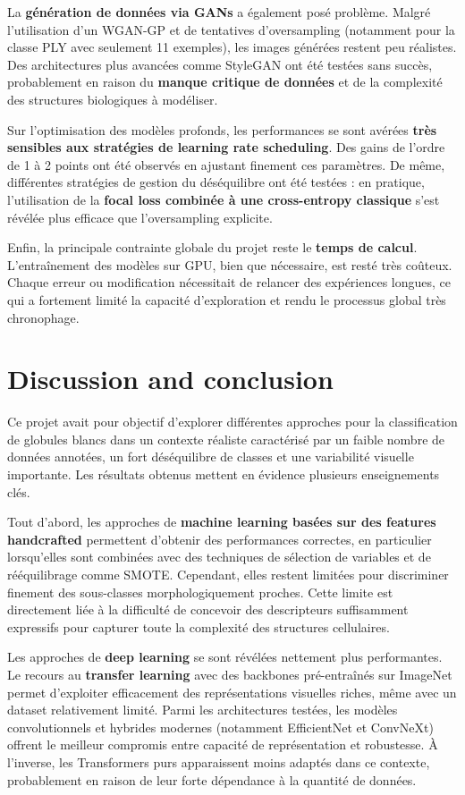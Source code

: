 \documentclass[journal,twocolumn]{IEEEtran}
\begin{document}
La \textbf{génération de données via GANs} a également posé problème. Malgré l’utilisation d’un WGAN-GP et de tentatives d’oversampling (notamment pour la classe PLY avec seulement 11 exemples), les images générées restent peu réalistes. Des architectures plus avancées comme StyleGAN ont été testées sans succès, probablement en raison du \textbf{manque critique de données} et de la complexité des structures biologiques à modéliser.

Sur l’optimisation des modèles profonds, les performances se sont avérées \textbf{très sensibles aux stratégies de learning rate scheduling}. Des gains de l’ordre de 1 à 2 points ont été observés en ajustant finement ces paramètres. De même, différentes stratégies de gestion du déséquilibre ont été testées : en pratique, l’utilisation de la \textbf{focal loss combinée à une cross-entropy classique} s’est révélée plus efficace que l’oversampling explicite.

Enfin, la principale contrainte globale du projet reste le \textbf{temps de calcul}. L’entraînement des modèles sur GPU, bien que nécessaire, est resté très coûteux. Chaque erreur ou modification nécessitait de relancer des expériences longues, ce qui a fortement limité la capacité d’exploration et rendu le processus global très chronophage.


\section{Discussion and conclusion}

Ce projet avait pour objectif d’explorer différentes approches pour la classification de globules blancs dans un contexte réaliste caractérisé par un faible nombre de données annotées, un fort déséquilibre de classes et une variabilité visuelle importante. Les résultats obtenus mettent en évidence plusieurs enseignements clés.

Tout d’abord, les approches de \textbf{machine learning basées sur des features handcrafted} permettent d’obtenir des performances correctes, en particulier lorsqu’elles sont combinées avec des techniques de sélection de variables et de rééquilibrage comme SMOTE. Cependant, elles restent limitées pour discriminer finement des sous-classes morphologiquement proches. Cette limite est directement liée à la difficulté de concevoir des descripteurs suffisamment expressifs pour capturer toute la complexité des structures cellulaires.

Les approches de \textbf{deep learning} se sont révélées nettement plus performantes. Le recours au \textbf{transfer learning} avec des backbones pré-entraînés sur ImageNet permet d’exploiter efficacement des représentations visuelles riches, même avec un dataset relativement limité. Parmi les architectures testées, les modèles convolutionnels et hybrides modernes (notamment EfficientNet et ConvNeXt) offrent le meilleur compromis entre capacité de représentation et robustesse. À l’inverse, les Transformers purs apparaissent moins adaptés dans ce contexte, probablement en raison de leur forte dépendance à la quantité de données.
\end{document}
